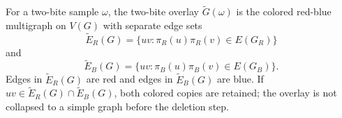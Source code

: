 \begin{definition}
For a two-bite sample \(\omega\), the two-bite overlay
\(\widetilde G(\omega)\) is the colored red-blue multigraph on \(V(G)\) with
separate edge sets
\[
\widetilde E_R(G)=
\{uv:\pi_R(u)\pi_R(v)\in E(G_R)\}
\]
and
\[
\widetilde E_B(G)=
\{uv:\pi_B(u)\pi_B(v)\in E(G_B)\}.
\]
Edges in \(\widetilde E_R(G)\) are red and edges in \(\widetilde E_B(G)\) are
blue.  If \(uv\in \widetilde E_R(G)\cap\widetilde E_B(G)\), both colored
copies are retained; the overlay is not collapsed to a simple graph before the
deletion step.
\end{definition}
